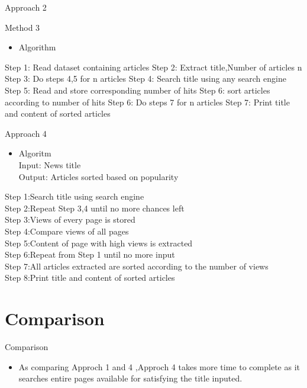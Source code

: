 \documentclass{beamer}
\begin{document}
	\begin{frame}{Approach 2}
		
	\end{frame}
	\begin{frame}{Method 3}
		\begin{itemize}
			\item Algorithm
		\end{itemize}
		Step 1: Read dataset containing articles \newline
		Step 2: Extract title,Number of articles n \newline
		Step 3: Do steps 4,5 for n articles \newline
		Step 4: Search title using any search engine \newline
		Step 5: Read and store corresponding number of hits \newline
		Step 6: sort articles according to number of hits \newline
		Step 6: Do steps 7 for n articles \newline
		Step 7: Print title and content of sorted articles
		
	\end{frame}
	\begin{frame}{Approach 4}
	   \begin{itemize}
        	\item Algoritm\\
        	\footnotesize
        	Input: News title\\
        	Output: Articles sorted based on popularity \\  
   	   \end{itemize}	
            Step 1:Search title using search engine\\
            Step 2:Repeat Step 3,4 until no more chances left\\
            Step 3:Views of every page is stored\\
            Step 4:Compare views of all pages\\
            Step 5:Content of page with high views is extracted\\
            Step 6:Repeat from Step 1 until no more input\\
            Step 7:All articles extracted are sorted according to the number of views\\
            Step 8:Print title and content of sorted articles\\
	\end{frame}
	\section{Comparison}
	\begin{frame}{Comparison}
	    \begin{itemize}
            \item As comparing Approch 1 and 4 ,Approch 4 takes more time to complete as it searches entire pages available for satisfying the title inputed.      
  	    \end{itemize}
	\end{frame}
\end{document}
